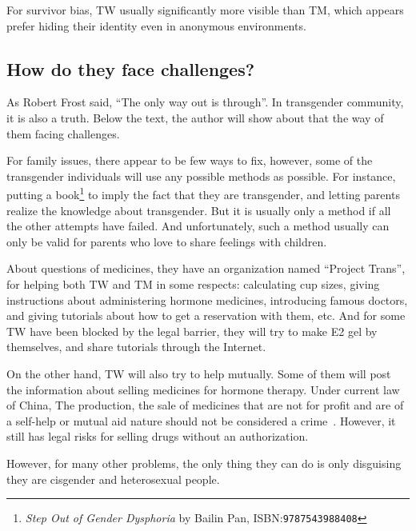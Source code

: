 \documentclass{article}
\begin{document}
		For survivor bias, TW usually significantly more visible than TM, which appears prefer hiding their identity even in anonymous environments.

		\subsection{How do they face challenges?} 
		As Robert Frost said, ``The only way out is through''. In transgender community, it is also a truth. Below the text, the author will show about that the way of them facing challenges.

		For family issues, there appear to be few ways to fix, however, some of the transgender individuals will use any possible methods as possible. For instance, putting a book\footnote{\textit{Step Out of Gender Dysphoria} by Bailin Pan, ISBN:\texttt{9787543988408}} to imply the fact that they are transgender, and letting parents realize the knowledge about transgender. But it is usually only a method if all the other attempts have failed. And unfortunately, such a method usually can only be valid for parents who love to share feelings with children.

		About questions of medicines, they have an organization named ``Project Trans'', for helping both TW and TM in some respects: calculating cup sizes, giving instructions about administering hormone medicines, introducing famous doctors, and giving tutorials about how to get a reservation with them, etc. And for some TW have been blocked by the legal barrier, they will try to make E2 gel by themselves, and share tutorials through the Internet\cite{Liu2025}.

		On the other hand, TW will also try to help mutually. Some of them will post the information about selling medicines for hormone therapy. Under current law of China, The production, the sale of medicines that are not for profit and are of a self-help or mutual aid nature should not be considered a crime~\cite{drug2022}. However, it still has legal risks for selling drugs without an authorization. 

		However, for many other problems, the only thing they can do is only disguising they are cisgender and heterosexual people.
	
\end{document}
